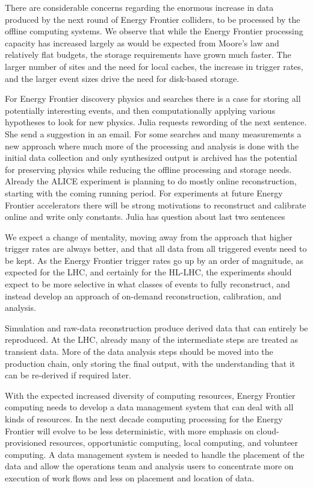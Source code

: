 There are considerable concerns regarding the enormous increase in data
produced by the next round of Energy Frontier colliders,   to be processed by the offline
computing systems.  We observe that while the Energy Frontier processing capacity has
increased largely as would be expected from Moore's law and relatively
flat budgets, the storage requirements have grown much faster.  The larger
number of sites and the need for local caches, the increase in trigger rates,
and the larger event sizes drive the need for disk-based storage.

For Energy Frontier discovery physics and searches there is a case for storing all
potentially interesting events, and then computationally  applying various
hypotheses to look for new physics.  
{\color{red} Julia requests rewording of the next sentence.  She send a suggestion in an email.}
For some searches and many measurements a
new approach where much more of the processing and analysis is done with the
initial data collection and only synthesized output is archived has the
potential for preserving physics while reducing the offline processing and
storage needs.  Already the ALICE experiment is planning to do mostly online
reconstruction, starting with  the coming running period.   For experiments at
future Energy Frontier accelerators there will be strong motivations to reconstruct and
calibrate online and write only constants.
{\color{red} Julia has question about last two sentences}

We expect a change of mentality, moving away from the approach that higher
trigger rates are always better, and that all data from  all triggered events
need to be kept.   As the Energy Frontier trigger rates go up by an order of magnitude,  as
expected for the LHC, and certainly for the HL-LHC,  the experiments
should expect to be more selective in what classes of events to fully
reconstruct,  and instead develop an approach of on-demand reconstruction,
calibration, and analysis.

Simulation and raw-data reconstruction produce derived data that can
entirely be reproduced. At the LHC, already many of the intermediate steps are
treated as transient data.   More of the data analysis steps should be moved
into the production chain, only storing the final output, with the
understanding that it can be re-derived if required later.

With the expected increased diversity of computing resources, Energy Frontier computing
needs to develop a data management system that can deal with all kinds of
resources.   In the next decade computing processing for the Energy Frontier will evolve to
be less deterministic, with more emphasis on cloud-provisioned resources,
opportunistic computing, local computing, and volunteer computing.   A data
management system is needed to handle the placement of the data and allow the
operations team and analysis users to concentrate more on execution of work
flows and less on placement and location of data.

